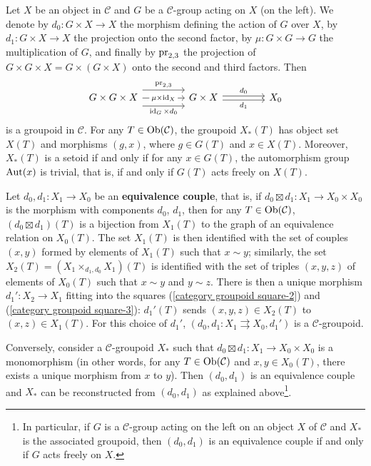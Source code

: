 \begin{example}\label{category groupoid by group action}
Let $X$ be an object in $\mathcal{C}$ and $G$ be a $\mathcal{C}$-group acting on $X$ (on the left). We denote by $d_0:G\times X\to X$ the morphism defining the action of $G$ over $X$, by $d_1:G\times X\to X$ the projection onto the second factor, by $\mu:G\times G\to G$ the multiplication of $G$, and finally by $\mathrm{pr}_{2,3}$ the projection of $G\times G\times X=G\times(G\times X)$ onto the second and third factors. Then
\[\begin{tikzcd}[column sep=15mm]
G\times G\times X\ar[r,shift left=8pt,"\pr_{2,3}"]\ar[r,shift right=8pt,swap,"\id_G\times d_0"]\ar[r,"\mu\times\id_X"description]&G\times X\ar[r,shift left=2pt,"d_0"]\ar[r,shift right=2pt,swap,"d_1"]&X_0
\end{tikzcd}\]
is a groupoid in $\mathcal{C}$. For any $T\in\mathrm{Ob}(\mathcal{C})$, the groupoid $X_*(T)$ has object set $X(T)$ and morphisms $(g,x)$, where $g\in G(T)$ and $x\in X(T)$. Moreover, $X_*(T)$ is a setoid if and only if for any $x\in G(T)$, the automorphism group $\mathrm{Aut}(x)$ is trivial, that is, if and only if $G(T)$ acts freely on $X(T)$.
\end{example}

\begin{example}\label{category groupoid from equivalence relation}
Let $d_0,d_1:X_1\to X_0$ be an \textbf{equivalence couple}, that is, if $d_0\boxtimes d_1:X_1\to X_0\times X_0$ is the morphism with components $d_0$, $d_1$, then for any $T\in\mathrm{Ob}(\mathcal{C})$, $(d_0\boxtimes d_1)(T)$ is a bijection from $X_1(T)$ to the graph of an equivalence relation on $X_0(T)$. The set $X_1(T)$ is then identified with the set of couples $(x,y)$ formed by elements of $X_1(T)$ such that $x\sim y$; similarly, the set $X_2(T)=(X_1\times_{d_1,d_0}X_1)(T)$ is identified with the set of triples $(x,y,z)$ of elements of $X_0(T)$ such that $x\sim y$ and $y\sim z$. There is then a unique morphism $d_1':X_2\to X_1$ fitting into the squares (\ref{category groupoid square-2}) and (\ref{category groupoid square-3}): $d_1'(T)$ sends $(x,y,z)\in X_2(T)$ to $(x,z)\in X_1(T)$. For this choice of $d_1'$, $(d_0,d_1:X_1\rightrightarrows X_0,d_1')$ is a $\mathcal{C}$-groupoid.\par
Conversely, consider a $\mathcal{C}$-groupoid $X_*$ such that $d_0\boxtimes d_1:X_1\to X_0\times X_0$ is a monomorphism (in other words, for any $T\in\mathrm{Ob}(\mathcal{C})$ and $x,y\in X_0(T)$, there exists a unique morphism from $x$ to $y$). Then $(d_0,d_1)$ is an equivalence couple and $X_*$ can be reconstructed from $(d_0,d_1)$ as explained above\footnote{In particular, if $G$ is a $\mathcal{C}$-group acting on the left on an object $X$ of $\mathcal{C}$ and $X_*$ is the associated groupoid, then $(d_0,d_1)$ is an equivalence couple if and only if $G$ acts freely on $X$.}. 
\end{example}

